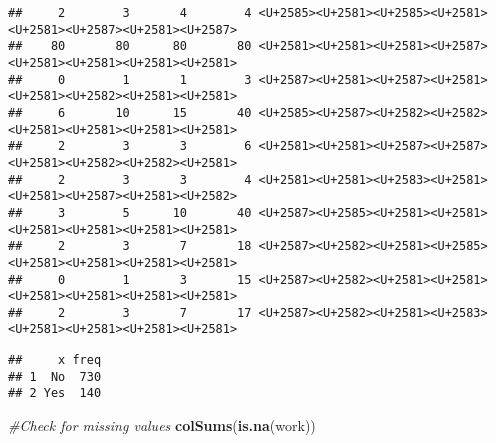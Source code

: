 \documentclass[]{article}
\newenvironment{Shaded}{\begin{snugshade}}{\end{snugshade}}
\newcommand{\CommentTok}[1]{\textcolor[rgb]{0.56,0.35,0.01}{\textit{#1}}}
\newcommand{\KeywordTok}[1]{\textcolor[rgb]{0.13,0.29,0.53}{\textbf{#1}}}
\newcommand{\NormalTok}[1]{#1}
\newcommand{\OperatorTok}[1]{\textcolor[rgb]{0.81,0.36,0.00}{\textbf{#1}}}
\begin{document}
\begin{verbatim}
##     2        3       4        4 <U+2585><U+2581><U+2585><U+2581><U+2581><U+2587><U+2581><U+2587>
##    80       80      80       80 <U+2581><U+2581><U+2581><U+2587><U+2581><U+2581><U+2581><U+2581>
##     0        1       1        3 <U+2587><U+2581><U+2587><U+2581><U+2581><U+2582><U+2581><U+2581>
##     6       10      15       40 <U+2585><U+2587><U+2582><U+2582><U+2581><U+2581><U+2581><U+2581>
##     2        3       3        6 <U+2581><U+2581><U+2587><U+2587><U+2581><U+2582><U+2582><U+2581>
##     2        3       3        4 <U+2581><U+2581><U+2583><U+2581><U+2581><U+2587><U+2581><U+2582>
##     3        5      10       40 <U+2587><U+2585><U+2581><U+2581><U+2581><U+2581><U+2581><U+2581>
##     2        3       7       18 <U+2587><U+2582><U+2581><U+2585><U+2581><U+2581><U+2581><U+2581>
##     0        1       3       15 <U+2587><U+2582><U+2581><U+2581><U+2581><U+2581><U+2581><U+2581>
##     2        3       7       17 <U+2587><U+2582><U+2581><U+2583><U+2581><U+2581><U+2581><U+2581>
\end{verbatim}

\begin{Shaded}
\end{Shaded}

\begin{verbatim}
##     x freq
## 1  No  730
## 2 Yes  140
\end{verbatim}

\begin{Shaded}
\begin{Highlighting}[]
\CommentTok{#Check for missing values}
\KeywordTok{colSums}\NormalTok{(}\KeywordTok{is.na}\NormalTok{(work))}
\end{Highlighting}
\end{Shaded}
\end{document}
